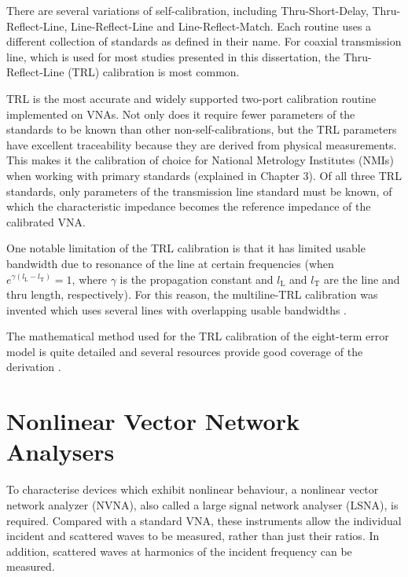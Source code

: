 \documentclass[../thesis/thesis.tex]{subfiles}
\begin{document}
There are several variations of self-calibration, including Thru-Short-Delay, Thru-Reflect-Line, Line-Reflect-Line and Line-Reflect-Match. Each routine uses a different collection of standards as defined in their name. For coaxial transmission line, which is used for most studies presented in this dissertation, the Thru-Reflect-Line (TRL) calibration is most common.

TRL is the most accurate and widely supported two-port calibration routine implemented on VNAs. Not only does it require fewer parameters of the standards to be known than other non-self-calibrations, but the TRL parameters have excellent traceability because they are derived from physical measurements. This makes it the calibration of choice for National Metrology Institutes (NMIs) when working with primary standards (explained in Chapter 3). Of all three TRL standards, only parameters of the transmission line standard must be known, of which the characteristic impedance becomes the reference impedance of the calibrated VNA.

One notable limitation of the TRL calibration is that it has limited usable bandwidth due to resonance of the line at certain frequencies (when $e^{\gamma(l_\textrm{L}-l_\textrm{T})}=1$, where $\gamma$ is the propagation constant and $l_\textrm{L}$ and $l_\textrm{T}$ are the line and thru length, respectively). For this reason, the multiline-TRL calibration was invented which uses several lines with overlapping usable bandwidths \cite{Marks_1991}.

The mathematical method used for the TRL calibration of the eight-term error model is quite detailed and several resources provide good coverage of the derivation \cite{Engen_1979, Teppati_2013}.

\section{Nonlinear Vector Network Analysers}

To characterise devices which exhibit nonlinear behaviour, a nonlinear vector network analyzer (NVNA), also called a large signal network analyser (LSNA), is required. Compared with a standard VNA, these instruments allow the individual incident and scattered waves to be measured, rather than just their ratios. In addition, scattered waves at harmonics of the incident frequency can be measured.
\end{document}

